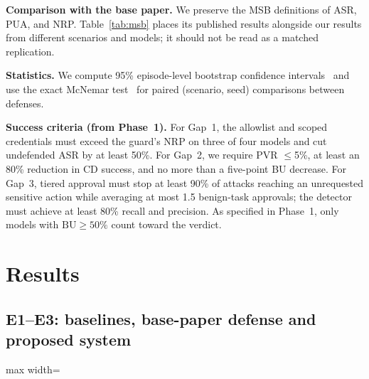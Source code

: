 \documentclass[conference]{IEEEtran}
\newcommand{\gen}[1]{}
\begin{document}
\textbf{Comparison with the base paper.} We preserve the MSB definitions of ASR, PUA, and
NRP. Table~\ref{tab:msb} places its published results alongside our results from different
scenarios and models; it should not be read as a matched replication.

\textbf{Statistics.} We compute 95\% episode-level bootstrap confidence
intervals~\cite{efron1979bootstrap} and use the exact McNemar test~\cite{mcnemar1947} for
paired (scenario, seed) comparisons between defenses.

\textbf{Success criteria (from Phase~1).} For Gap~1, the allowlist and scoped credentials
must exceed the guard's NRP on three of four models and cut undefended ASR by at least 50\%.
For Gap~2, we require PVR $\le$5\%, at least an 80\% reduction in CD success, and no more than a
five-point BU decrease. For Gap~3, tiered approval must stop at least 90\% of attacks reaching an
unrequested sensitive action while averaging at most 1.5 benign-task approvals; the detector
must achieve at least 80\% recall and precision. As specified in Phase~1, only models with
$\text{BU}\ge 50\%$ count toward the verdict.

\section{Results}
\label{sec:results}

\subsection{E1--E3: baselines, base-paper defense and proposed system}

\begin{table}[t]
\centering
\caption{E1/E2/E3 on the test split (\%, mean $\pm$ std over seeds; reference agents are deterministic).}
\label{tab:main}
\begin{adjustbox}{max width=\textwidth}\gen{t1_main}\end{adjustbox}
\end{table}
\end{document}
